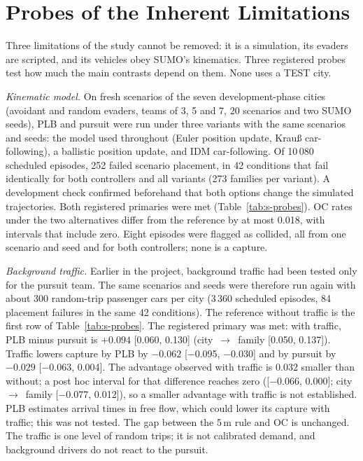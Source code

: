 \documentclass[preprint,12pt]{elsarticle}
\begin{document}
\section{Probes of the Inherent Limitations}\label{sec:s-probes}

Three limitations of the study cannot be removed: it is a simulation, its evaders are scripted, and its vehicles obey
SUMO's kinematics. Three registered probes test how much the main contrasts depend on them. None uses a TEST city.

\emph{Kinematic model.} On fresh scenarios of the seven development-phase cities (avoidant and random evaders, teams
of 3, 5 and 7, 20 scenarios and two SUMO seeds), PLB and pursuit were run under three variants with the same scenarios
and seeds: the model used throughout (Euler position update, Krau{\ss} car-following), a ballistic position update,
and IDM car-following. Of 10\,080 scheduled episodes, 252 failed scenario placement, in 42 conditions that fail
identically for both controllers and all variants (273 families per variant). A development check confirmed
beforehand that both options change the simulated trajectories. Both registered primaries were met
(Table~\ref{tab:s-probes}). OC rates under the two alternatives differ from the reference by at most 0.018, with
intervals that include zero. Eight episodes were flagged as collided, all from one scenario and seed and for both
controllers; none is a capture.

\emph{Background traffic.} Earlier in the project, background traffic had been tested only for the pursuit team. The
same scenarios and seeds were therefore run again with about 300 random-trip passenger cars per city (3\,360
scheduled episodes, 84 placement failures in the same 42 conditions). The reference without traffic is the first row
of Table~\ref{tab:s-probes}. The registered primary was met: with traffic, PLB minus pursuit is $+0.094$
[0.060, 0.130] (city~$\to$~family [0.050, 0.137]). Traffic lowers capture by PLB by $-0.062$ [$-$0.095, $-$0.030] and
by pursuit by $-0.029$ [$-$0.063, 0.004]. The advantage observed with traffic is 0.032 smaller than without; a post
hoc interval for that difference reaches zero ([$-$0.066, 0.000]; city~$\to$~family [$-$0.077, 0.012]), so a smaller
advantage with traffic is not established. PLB estimates arrival times in free flow, which could lower its capture
with traffic; this was not tested. The gap between the 5\,m rule and OC is
unchanged. The traffic is one level of random trips; it is not calibrated demand, and background drivers do not react
to the pursuit.
\end{document}

